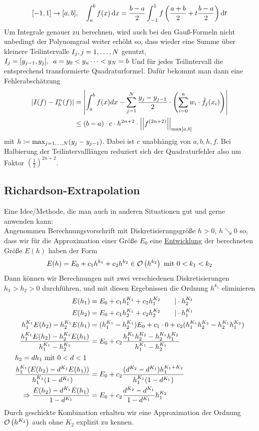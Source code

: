 \documentclass[../Skript.tex]{subfiles}
\begin{document}
{\[[-1,1]\to [a,b],\hspace{1em} \int_a^b f(x)\mathop{}\!\mathrm{d} x = 
\frac{b-a}{2}\int_{-1}^1 f\left(\frac{a+b}{2}+ t\frac{b-a}{2}\right)\mathop{}\!\mathrm{d} 
t\] 
Um Integrale genauer zu berechnen, wird auch bei den Gauß-Formeln nicht 
unbedingt der
Polynomgrad weiter erhöht so, dass wieder eine Summe über kleinere 
Teilintervalle $I_j, \igb j 1 N$ genutzt,
$I_j = [y_{j-1}, y_j], \hspace{.5em} a=y_0< y_n \dots < y_N = b$
Und für jedes Teilintervall die entsprechend transformierte 
Quadraturformel. Dafür bekommt man
dann eine Fehlerabschätzung \begin{align*}
        \left\vert I(f) - I_h^{n}(f) \right\vert &= \left\vert \int_a^b f(x)dx - \sum_{j=1}^N 
        \frac{y_j-y_{j-1}}{2}\cdot \left(\sum_{i=0}^n w_i \cdot 
        \Tilde{f_j}(x_i)\right) \right\vert\\
        &\leq (b-a)\cdot c \cdot h^{2n+2}\cdot 
        \left\vert\left\vert f^{(2n+2)}\right\vert\right\vert_{\max[a,b]}
    \end{align*}
    mit $h\coloneqq \max_{\igb j 1 N}(y_j-y_{j-1})$. Dabei ist $c$ 
    unabhängig von $a,b,h,f$.
    Bei Halbierung der Teilintervalllängen reduziert sich der 
    Quadraturfehler also um 
    Faktor $\left(\frac{1}{2}\right)^{2n+2}$.
\subsection{Richardson-Extrapolation}
Eine Idee/Methode, die man auch in anderen Situationen gut und gerne 
anwenden 
kann:\\
Angenommen Berechnungsvorschrift mit Diskretisierungsgröße $h > 0$, 
$h\searrow 0$
so, dass wir für die Approximation einer Größe $E_0$ eine 
\underline{Entwicklung}
der berechneten Größe $E(h)$ haben der Form \[
    E(h)  = E_0 + c_1h^{k_1}+c_2h^{k_2} \in \calO{h^{k_2}}\text{ mit } 
    0<k_1<k_2
\] 
Dann können wir Berechnungen mit zwei verschiedenen Diskretisierungen 
$h_1 > h_2 
> 0$ durchführen, und mit diesen Ergebnissen die Ordnung $h^{k_1}$ 
eliminieren
\begin{align*}
    E(h_1)&=E_0+c_1h_1^{K_1}+c_2h_1^{K_2}\qquad \vert\cdot h_2^{K_1}\\
    E(h_2)&=E_0+c_1h_2^{K_1}+c_2h_2^{K_2}\qquad \vert\cdot h_1^{K_1}\\
    h_1^{K_1}E(h_2)-h_2^{K_1}E(h_1)&=(h_1^{K_1}-
    h_2^{K_1})E_0+c_1\cdot0+c_2(h_1^{K_1}h_2^{K_2}-h_2^{K_1}h_1^{K_2})\\
    \frac{ h_1^{K_1}E(h_2)-h_2^{K_1}E(h_1)}{h_1^{K_1}-h_2^{K_1}}&= 
    E_0+c_2\frac{h_1^{K_1}h_2^{K_2}-h_2^{K_1}h_1^{K_2}}{h_1^{K_1}-
    h_2^{K_1}}\\
    \intertext{\(h_2=dh_1\) mit \(0<d<1\)}
    \frac{h_1^{K_1}(E(h_2)-d^{K_1}E(h_1))}{h_1^{K_1}(1-d^{K_1})}&= 
    E_0+c_2\frac{(d^{K_2}-d^{K_1})h_1^{K_1+K_2}}{h_1^{K_1}(1-d^{K_1})}\\
    \Rightarrow \frac{E(h_2)-d^{K_1}E(h_1)}{1-d^{K_1}}&= 
    E_0+c_2\frac{d^{K_2}-d^{K_1}}{1-d^{K_1}}h_1^{K_2}
\end{align*}
Durch geschickte Kombination erhalten wir eine Approximation der Ordnung 
\(\calO{h^{K_2}}\) auch ohne \(K_2\) explizit zu kennen.

}
\end{document}
